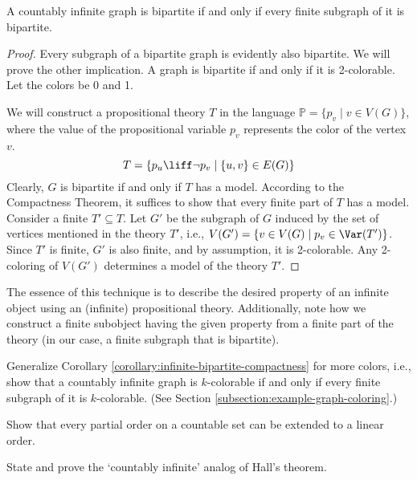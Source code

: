 \begin{corollary}\label{corollary:infinite-bipartite-compactness}
A countably infinite graph is bipartite if and only if every finite subgraph of it is bipartite.    
\end{corollary}

\begin{proof}
    Every subgraph of a bipartite graph is evidently also bipartite. We will prove the other implication. A graph is bipartite if and only if it is 2-colorable. Let the colors be 0 and 1.

    We will construct a propositional theory $T$ in the language $\mathbb{P} = \{p_v \mid v \in V(G)\}$, where the value of the propositional variable $p_v$ represents the color of the vertex $v$.
    $$  
        T = \{p_u \liff \neg p_v \mid \{u, v\} \in E(G)\}
    $$
    Clearly, $G$ is bipartite if and only if $T$ has a model. According to the Compactness Theorem, it suffices to show that every finite part of $T$ has a model. Consider a finite $T' \subseteq T$. Let $G'$ be the subgraph of $G$ induced by the set of vertices mentioned in the theory $T'$, i.e., $V(G') = \{v \in V(G) \mid p_v \in \Var(T')\}$. Since $T'$ is finite, $G'$ is also finite, and by assumption, it is 2-colorable. Any 2-coloring of $V(G')$ determines a model of the theory $T'$.
\end{proof}

The essence of this technique is to describe the desired property of an infinite object using an (infinite) propositional theory. Additionally, note how we construct a finite subobject having the given property from a finite part of the theory (in our case, a finite subgraph that is bipartite).

\begin{exercise}
    Generalize Corollary \ref{corollary:infinite-bipartite-compactness} for more colors, i.e., show that a countably infinite graph is $k$-colorable if and only if every finite subgraph of it is $k$-colorable. (See Section \ref{subsection:example-graph-coloring}.)
\end{exercise}

\begin{exercise}
    Show that every partial order on a countable set can be extended to a linear order.
\end{exercise}

\begin{exercise}
    State and prove the `countably infinite' analog of Hall's theorem.
\end{exercise}

